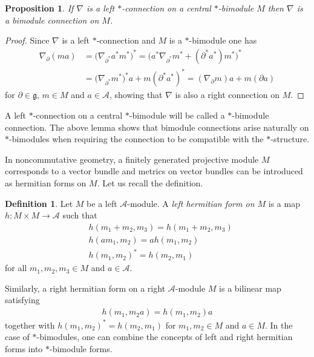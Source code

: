 \documentclass{amsart}
\newcommand{\paraa}[1]{\big(#1\big)}
\newtheorem{proposition}[theorem]{Proposition}
\theoremstyle{definition}
\newtheorem{definition}[theorem]{Definition}
\theoremstyle{remark}
\numberwithin{equation}{section}
\newcommand{\A}{\mathcal{A}}
\renewcommand{\d}{\partial}
\newcommand{\g}{\mathfrak{g}}
\renewcommand{\emph}[1]{\textit{#1}}
\begin{document}
\begin{proposition}\label{prop:l.st.conn.bimodule.conn}
  If $\nabla$ is a left $\ast$-connection on a central $\ast$-bimodule
  $M$ then $\nabla$ is a bimodule connection on $M$.
\end{proposition}

\begin{proof}
  Since $\nabla$ is a left $\ast$-connection and $M$ is a $\ast$-bimodule one has
  \begin{align*}
    \nabla_\d (ma) &= \paraa{\nabla_{\d^\ast}a^\ast m^\ast}^\ast
    =\paraa{a^\ast\nabla_{\d^\ast}m^\ast+(\d^\ast a^\ast)m^\ast}^\ast\\
                   &=\paraa{\nabla_{\d^\ast}m^\ast}^\ast a + m(\d^\ast a^\ast)^\ast
                     = (\nabla_{\d}m)a + m(\d a)
  \end{align*}
  for $\d\in\g$, $m\in M$ and $a\in\A$, showing that $\nabla$ is also a right connection on $M$.
\end{proof}

\noindent
A left $\ast$-connection on a central $\ast$-bimodule will be called a
$\ast$-bimodule connection. The above lemma shows that bimodule
connections arise naturally on $\ast$-bimodules when requiring the
connection to be compatible with the $\ast$-structure.

In noncommutative geometry, a finitely generated projective module $M$
corresponds to a vector bundle and metrics on vector bundles can be
introduced as hermitian forms on $M$. Let us recall the definition.

\begin{definition}
  Let $M$ be a left $\A$-module. A \emph{left hermitian form on $M$}
  is a map $h:M\times M\to\A$ such that
  \begin{align*}
    &h(m_1+m_2,m_3) = h(m_1+m_2,m_3)\\
    &h(am_1,m_2) = ah(m_1,m_2)\\
    &h(m_1,m_2)^\ast = h(m_2,m_1)
  \end{align*}
  for all $m_1,m_2,m_3\in M$ and $a\in\A$.
\end{definition}

\noindent
Similarly, a right hermitian form on a right $\A$-module $M$ is a bilinear map satisfying
\begin{align*}
  h(m_1,m_2a) = h(m_1,m_2)a
\end{align*}
together with $h(m_1,m_2)^\ast=h(m_2,m_1)$ for $m_1,m_2\in M$ and
$a\in M$.  In the case of $\ast$-bimodules, one can combine the
concepts of left and right hermitian forms into $\ast$-bimodule forms.
\end{document}
